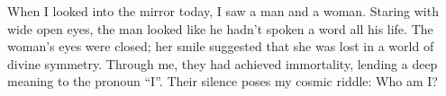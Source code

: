 \documentclass{article}
\begin{document}
\newline
\newline
When I looked into the mirror today, I saw a man and a woman. Staring
with wide open eyes, the man looked like he hadn't spoken a word all his
life. The woman's eyes were closed; her smile suggested that she was
lost in a world of divine symmetry. Through me, they had achieved
immortality, lending a deep meaning to the pronoun ``I''. 
\newline
\newline
Their silence poses my cosmic riddle: Who am I?
\end{document}
